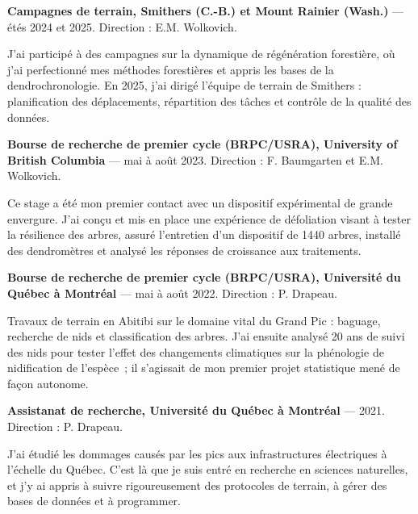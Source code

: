 \documentclass[12pt]{article}
\begin{document}
\textbf{Campagnes de terrain, Smithers (C.-B.) et Mount Rainier (Wash.)} --- étés 2024 et 2025. Direction : E.M. Wolkovich. 

J'ai participé à des campagnes sur la dynamique de régénération forestière, où j'ai perfectionné mes méthodes forestières et appris les bases de la dendrochronologie. En 2025, j'ai dirigé l'équipe de terrain de Smithers : planification des déplacements, répartition des tâches et contrôle de la qualité des données. 

\textbf{Bourse de recherche de premier cycle (BRPC/USRA), University of British Columbia} --- mai à août 2023. Direction : F. Baumgarten et E.M. Wolkovich.

Ce stage a été mon premier contact avec un dispositif expérimental de grande envergure. J'ai conçu et mis en place une expérience de défoliation visant à tester la résilience des arbres, assuré l'entretien d'un dispositif de 1440 arbres, installé des dendromètres et analysé les réponses de croissance aux traitements. 

\textbf{Bourse de recherche de premier cycle (BRPC/USRA), Université du Québec à Montréal} --- mai à août 2022. Direction : P. Drapeau.

Travaux de terrain en Abitibi sur le domaine vital du Grand Pic : baguage, recherche de nids et classification des arbres. J'ai ensuite analysé 20 ans de suivi des nids pour tester l'effet des changements climatiques sur la phénologie de nidification de l'espèce~; il s'agissait de mon premier projet statistique mené de façon autonome. 

\textbf{Assistanat de recherche, Université du Québec à Montréal} --- 2021. Direction : P. Drapeau.

J'ai étudié les dommages causés par les pics aux infrastructures électriques à l'échelle du Québec. C'est là que je suis entré en recherche en sciences naturelles, et j'y ai appris à suivre rigoureusement des protocoles de terrain, à gérer des bases de données et à programmer.
\end{document}
